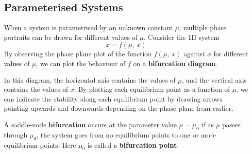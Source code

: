 \documentclass{article}
\begin{document}
\subsection{Parameterised Systems}
When a system is parametrised by an unknown constant \(\mu\), multiple phase portraits can be drawn for different values of \(\mu\).
Consider the 1D system
\begin{equation*}
    \dot{x} = f\left( \mu,\: x \right)
\end{equation*}
By observing the phase plane plot of the function \(f\left( \mu, \: x \right)\) against \(x\) for different values of \(\mu\),
we can plot the behaviour of \(f\) on a \textbf{bifurcation diagram}.

In this diagram, the horizontal axis contains the values of \(\mu\), and the vertical axis contains the values of \(x\).
By plotting each equilibrium point as a function of \(\mu\),
we can indicate the stability along each equilibrium point by drawing arrows pointing upwards and downwards depending on
the phase plane from earlier.

A saddle-node \textbf{bifurcation} occurs at the parameter value \(\mu = \mu_0\) if as
\(\mu\) passes through \(\mu_0\), the system goes from no equilibrium points to one or more equilibrium points.
Here \(\mu_0\) is called a \textbf{bifurcation point}.
\end{document}
